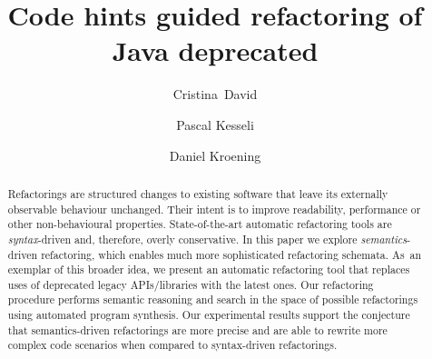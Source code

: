\documentclass[runningheads,a4paper]{llncs}
\begin{document}




\title{Code hints guided refactoring of Java deprecated}

\author{
\mbox{Cristina David} \and
Pascal Kesseli \and
Daniel Kroening}





\maketitle

\begin{abstract}
%
  Refactorings are structured changes to existing software that leave its
  externally observable behaviour unchanged.  Their intent is to improve
  readability, performance or other non-behavioural properties. 
  State-of-the-art automatic refactoring tools are {\em syntax}-driven and,
  therefore, overly conservative.  In this paper we explore {\em
  semantics}-driven refactoring, which enables much more sophisticated
  refactoring schemata.  As~an exemplar of this broader idea, we present
  an automatic refactoring tool that replaces uses of deprecated legacy APIs/libraries
  with the latest ones.
  Our refactoring procedure performs
  semantic reasoning and search in the space of possible refactorings using
  automated program synthesis.  Our experimental results support the
  conjecture that semantics-driven refactorings are more precise and are
  able to rewrite more complex code scenarios when compared to syntax-driven
  refactorings.
%
\end{abstract}
\end{document}
